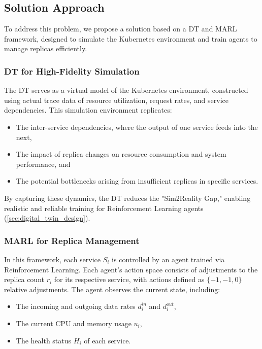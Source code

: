 \documentclass[conference]{IEEEtran}
\begin{document}
\subsection{Solution Approach}

To address this problem, we propose a solution based on a DT and MARL framework, designed to simulate the Kubernetes environment and train agents to manage replicas efficiently.

\subsubsection{DT for High-Fidelity Simulation}

The DT serves as a virtual model of the Kubernetes environment, constructed using actual trace data of resource utilization, request rates, and service dependencies. This simulation environment replicates:
\begin{itemize}
    \item The inter-service dependencies, where the output of one service feeds into the next,
    \item The impact of replica changes on resource consumption and system performance, and
    \item The potential bottlenecks arising from insufficient replicas in specific services.
\end{itemize}
By capturing these dynamics, the DT reduces the "Sim2Reality Gap," enabling realistic and reliable training for Reinforcement Learning agents (\autoref{sec:digital_twin_design}).

\subsubsection{MARL for Replica Management}

In this framework, each service $S_i$ is controlled by an agent trained via Reinforcement Learning. Each agent's action space consists of adjustments to the replica count $r_i$ for its respective service, with actions defined as $\{+1, -1, 0\}$ relative adjustments. The agent observes the current state, including:
\begin{itemize}
    \item The incoming and outgoing data rates $\mathit{d_i^{in}}$ and $\mathit{d_i^{out}}$,
    \item The current CPU and memory usage $\mathit{u_i}$,
    \item The health status $\mathit{H_i}$ of each service.
\end{itemize}
\end{document}
